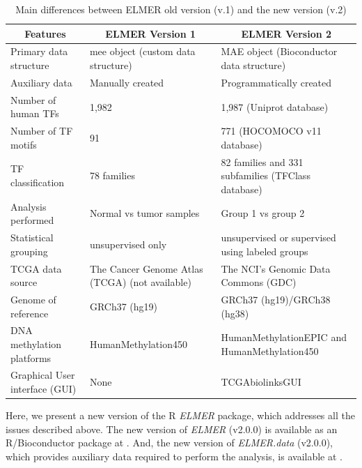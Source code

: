 \begin{table}[h!]
\footnotesize
\centering
\caption{Main differences between ELMER old version (v.1) and the new version (v.2)}
\label{tab:summary}
\begin{tabular}{|p{4cm}|p{5cm}|p{6cm}|}
\toprule
\toprule
\multicolumn{1}{|c|}{\textbf{Features}} & \multicolumn{1}{|c|}{\textbf{ELMER Version 1}} & \multicolumn{1}{|c|}{\textbf{ELMER Version 2}}   \\ \midrule \midrule
Primary data structure   & mee object (custom data structure)   & MAE object (Bioconductor data structure) \\ \hline
Auxiliary data  & Manually created  & Programmatically created \\  \hline
Number of human TFs & 1,982  & 1,987 (Uniprot database)  \\  \hline
Number of TF motifs  & 91  & 771  (HOCOMOCO v11 database)  \\  \hline
TF classification    & 78 families & 82 families and 331 subfamilies \newline(TFClass database) \\  \hline
Analysis performed  & Normal vs tumor samples & Group 1 vs group 2  \\  \hline
Statistical grouping   & unsupervised only & unsupervised or supervised using labeled groups   \\  \hline
TCGA data source   & The Cancer Genome Atlas (TCGA) (not available)          & The NCI's Genomic Data Commons (GDC) \\  \hline
Genome of reference   & GRCh37 (hg19)   & GRCh37 (hg19)/GRCh38 (hg38)          \\ \hline
DNA methylation platforms  & HumanMethylation450   & HumanMethylationEPIC and HumanMethylation450   \\  \hline
Graphical User interface (GUI) & None & TCGAbiolinksGUI \\
\bottomrule
\end{tabular}
\end{table}
\egroup

Here, we present a new version of the R \textit{ELMER} package, which addresses all the issues described above. 
The new version of \textit{ELMER} (v2.0.0) is available as an R/Bioconductor package at . And, the new version of \textit{ELMER.data} (v2.0.0), which provides auxiliary data required to perform the analysis, is available at 
. 

